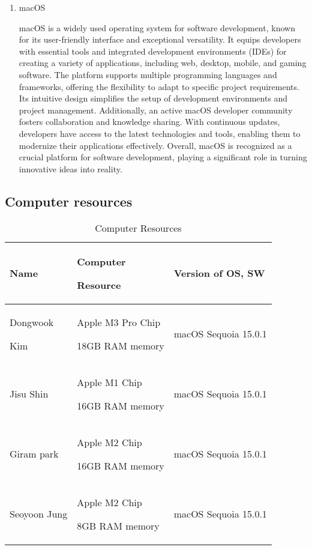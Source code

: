 \documentclass[conference]{IEEEtran}
\begin{document}
\begin{enumerate}[itemsep=2ex, parsep=1ex]
		\item macOS

			macOS is a widely used operating system for software development, known for
			its user-friendly interface and exceptional versatility. It equips
			developers with essential tools and integrated development environments (IDEs)
			for creating a variety of applications, including web, desktop, mobile,
			and gaming software. The platform supports multiple programming languages and
			frameworks, offering the flexibility to adapt to specific project
			requirements. Its intuitive design simplifies the setup of development environments
			and project management. Additionally, an active macOS developer community fosters
			collaboration and knowledge sharing. With continuous updates, developers have
			access to the latest technologies and tools, enabling them to modernize
			their applications effectively. Overall, macOS is recognized as a crucial
			platform for software development, playing a significant role in turning innovative
			ideas into reality.
	\end{enumerate}

	\vspace{4cm}

	\subsection{Computer resources}

	\begin{table}[h]
		\caption{Computer Resources}
		\def\arraystretch{1.4} \small
		\begin{tabular}{|p{1.8cm}|p{2.7cm}|p{3.1cm}|}
			\hline
			Name              & Computer \par Resource                 & Version of OS, SW    \\
			\hline
			Dongwook \par Kim & Apple M3 Pro Chip \par 18GB RAM memory & macOS Sequoia 15.0.1 \\
			\hline
			Jisu Shin         & Apple M1 Chip \par 16GB RAM memory     & macOS Sequoia 15.0.1 \\
			\hline
			Giram park        & Apple M2 Chip \par 16GB RAM memory     & macOS Sequoia 15.0.1 \\
			\hline
			Seoyoon Jung      & Apple M2 Chip \par 8GB RAM memory      & macOS Sequoia 15.0.1 \\
			\hline
		\end{tabular}
	\end{table}
\end{document}
